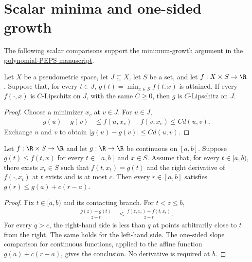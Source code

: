 \section{Scalar minima and one-sided growth}
\label{sec:minimum_envelope}

The following scalar comparisons support the minimum-growth argument in the
\href{https://github.com/openai/math/blob/adc7f1241b42e322a6451854ab7e4b4c146bf78a/preprints/Polynomial-PEPS-approximation-of-gapped-square-grid-ground-states-September-24-2026/build/sections/03-patches.tex\#L421-L481}{polynomial-PEPS manuscript}.

\begin{theorem}
    \label{thm:minimum_envelope_lipschitz}
    \leanok
    Let $X$ be a pseudometric space, let $J\subseteq X$, let $S$ be a set,
    and let $f:X\times S\to\R$. Suppose that, for every $t\in J$,
    $g(t)=\min_{x\in S}f(t,x)$ is attained. If every $f(\cdot,x)$ is
    $C$-Lipschitz on $J$, with the same $C\ge0$, then $g$ is
    $C$-Lipschitz on $J$.
\end{theorem}
\begin{proof}
    \leanok
    Choose a minimizer $x_v$ at $v\in J$. For $u\in J$,
    \begin{align*}
        g(u)-g(v)
         & \le f(u,x_v)-f(v,x_v)
        \le C d(u,v).
    \end{align*}
    Exchange $u$ and $v$ to obtain $|g(u)-g(v)|\le C d(u,v)$.
\end{proof}

\begin{theorem}
    \label{thm:minimum_envelope_affine}
    \leanok
    Let $f:\R\times S\to\R$ and let $g:\R\to\R$ be continuous on
    $[a,b]$. Suppose $g(t)\le f(t,x)$ for every $t\in[a,b]$ and
    $x\in S$. Assume that, for every $t\in[a,b)$, there exists
    $x_t\in S$ such that $f(t,x_t)=g(t)$ and the right derivative of
    $f(\cdot,x_t)$ at $t$ exists and is at most $c$. Then every
    $r\in[a,b]$ satisfies $g(r)\le g(a)+c(r-a)$.
\end{theorem}
\begin{proof}
    \leanok
    Fix $t\in[a,b)$ and its contacting branch. For $t<z\le b$,
    \begin{align*}
        \frac{g(z)-g(t)}{z-t}
         & \le \frac{f(z,x_t)-f(t,x_t)}{z-t}.
    \end{align*}
    For every $q>c$, the right-hand side is less than $q$ at points
    arbitrarily close to $t$ from the right. The same holds for the
    left-hand side. The one-sided slope comparison for continuous
    functions, applied to the affine function $g(a)+c(r-a)$, gives
    the conclusion. No derivative is required at $b$.
\end{proof}
